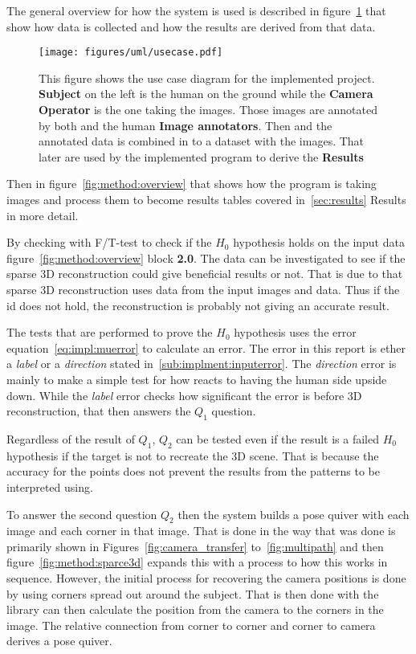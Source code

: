 The general overview for how the system is used is described in figure~\ref{fig:usecase} that show how data is collected and how the results are derived from that data.

\begin{figure}
\begin{center}
    \texttt{[image: figures/uml/usecase.pdf]}
\end{center}
\caption{This figure shows the use case diagram for the implemented project. \textbf{Subject} on the left is the human on the ground while the \textbf{Camera Operator} is the one taking the images.
Those images are annotated by both \openpose{ } and the human \textbf{Image annotators}.
Then \openpose{ } and the annotated data is combined in to a dataset with the images.
That later are used by the implemented program to derive the \textbf{Results}}
\label{fig:usecase}
\end{figure}

Then in figure~\ref{fig:method:overview} that shows how the program is taking images and process them to become results tables covered in~\ref{sec:results} Results in more detail.

By checking with F/T-test to check if the $H_0$ hypothesis holds on the input data figure~\ref{fig:method:overview} block \textbf{2.0}.
The data can be investigated to see if the sparse 3D reconstruction could give beneficial results or not.
That is due to that sparse 3D reconstruction uses data from the input images and data.
Thus if the id does not hold, the reconstruction is probably not giving an accurate result.

The tests that are performed to prove the $H_0$ hypothesis uses the error equation~\ref{eq:impl:muerror} to calculate an error.
The error in this report is ether a \textit{label} or a \textit{direction} stated in~\ref{sub:implment:inputerror}.
The \textit{direction} error is mainly to make a simple test for how \openpose{ } reacts to having the human side upside down.
While the \textit{label} error checks how significant the error is before 3D reconstruction, that then answers the $Q_1$ question.

Regardless of the result of $Q_1$, $Q_2$  can be tested even if the result is a failed $H_0$ hypothesis if the target is not to recreate the 3D scene.
That is because the accuracy for the points does not prevent the results from the \arcuo{ } patterns to be interpreted using.

To answer the second question $Q_2$ then the system builds a pose quiver with each image and each corner in that image.
That is done in the way that was done is primarily shown in Figures~\ref{fig:camera_transfer} to~\ref{fig:multipath} and then figure~\ref{fig:method:sparce3d} expands this with a process to how this works in sequence.
However, the initial process for recovering the camera positions is done by using \aruco{ } corners spread out around the subject.
That is then done with the \aruco{ } library can then calculate the position from the camera to the \acuro{ } corners in the image.
The relative connection from corner to corner and corner to camera derives a pose quiver.

